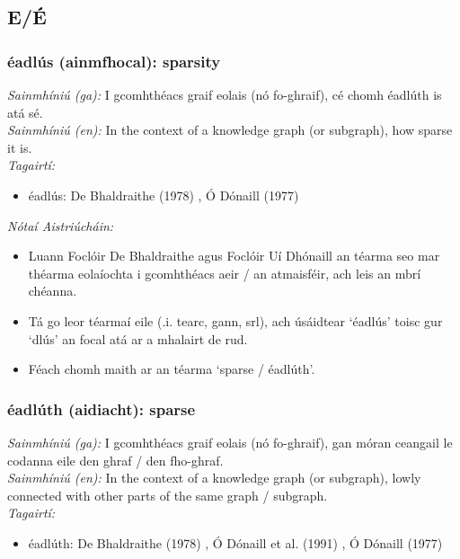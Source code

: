 \documentclass{article}
\begin{document}
\subsection*{E/É}

\subsubsection*{éadlús (ainmfhocal): sparsity}
 \noindent \textit{Sainmhíniú (ga):} I gcomhthéacs graif eolais (nó fo-ghraif), cé chomh éadlúth is atá sé.
\\
 \noindent \textit{Sainmhíniú (en):} In the context of a knowledge graph (or subgraph), how sparse it is.
\\
 \noindent \textit{Tagairtí:}
\begin{itemize}
	\item éadlús: De Bhaldraithe (1978) \cite{de-bhaldraithe}, Ó Dónaill (1977) \cite{odonaill}
\end{itemize}

 \noindent \textit{Nótaí Aistriúcháin:}
\begin{itemize}
	\item Luann Foclóir De Bhaldraithe agus Foclóir Uí Dhónaill an téarma seo  mar théarma eolaíochta i gcomhthéacs aeir / an atmaisféir, ach leis an mbrí chéanna.
	\item Tá go leor téarmaí eile (.i. tearc, gann, srl), ach úsáidtear `éadlús' toisc gur `dlús' an focal atá ar a mhalairt de rud.
	\item Féach chomh maith ar an téarma `sparse / éadlúth'.
\end{itemize}


\subsubsection*{éadlúth (aidiacht): sparse}
 \noindent \textit{Sainmhíniú (ga):} I gcomhthéacs graif eolais (nó fo-ghraif), gan móran ceangail le codanna eile den ghraf / den fho-ghraf.
\\
 \noindent \textit{Sainmhíniú (en):} In the context of a knowledge graph (or subgraph), lowly connected with other parts of the same graph / subgraph.
\\
 \noindent \textit{Tagairtí:}
\begin{itemize}
	\item éadlúth: De Bhaldraithe (1978) \cite{de-bhaldraithe}, Ó Dónaill et al. (1991) \cite{focloir-beag}, Ó Dónaill (1977) \cite{odonaill}
\end{itemize}
\end{document}
